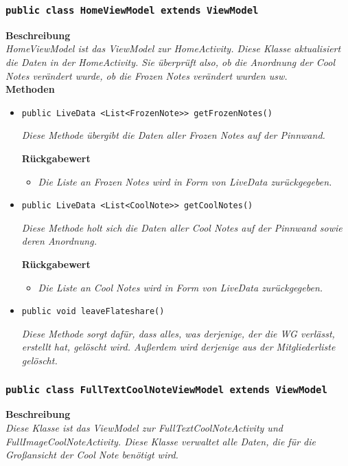              
             
        \subsubsection{\texttt{public class HomeViewModel extends ViewModel}}
        \textbf{Beschreibung} \\
        \textit{HomeViewModel ist das ViewModel zur HomeActivity. Diese Klasse aktualisiert die Daten in der HomeActivity. Sie überprüft also, ob die Anordnung der Cool Notes verändert wurde, ob die Frozen Notes verändert wurden usw.}\\   
        
		\textbf{Methoden}
 			\begin{itemize}
        		\item{\texttt{public LiveData <List<FrozenNote>> getFrozenNotes()}}
        	
        		\textit{Diese Methode übergibt die Daten aller Frozen Notes auf der Pinnwand.}
        
        		\textbf{Rückgabewert}
        		\begin{itemize}
        			\item\textit{Die Liste an Frozen Notes wird in Form von LiveData zurückgegeben.}
        		\end{itemize}
        	
        		\item{\texttt{public LiveData <List<CoolNote>> getCoolNotes()}}

        		\textit{Diese Methode holt sich die Daten aller Cool Notes auf der Pinnwand sowie deren Anordnung.}
        		
        	\textbf{Rückgabewert}
        	\begin{itemize}
        		\item\textit{Die Liste an Cool Notes wird in Form von LiveData zurückgegeben.}
			\end{itemize}	
	
			\item{\texttt{public void leaveFlateshare()}}
			
			\textit{Diese Methode sorgt dafür, dass alles, was derjenige, der die WG verlässt, erstellt hat, gelöscht wird. Außerdem wird derjenige aus der Mitgliederliste gelöscht.}
		
		\end{itemize}
        		
             
        \subsubsection{\texttt{public class FullTextCoolNoteViewModel extends ViewModel}}
        \textbf{Beschreibung} \\
        \textit{Diese Klasse ist das ViewModel zur FullTextCoolNoteActivity und FullImageCoolNoteActivity. Diese Klasse verwaltet alle Daten, die für die Großansicht der Cool Note benötigt wird.}\\
        
